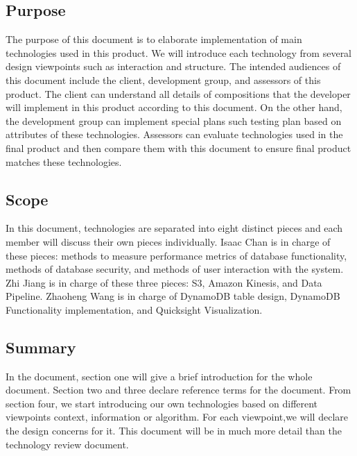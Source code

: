 \subsection{Purpose}
The purpose of this document is to elaborate implementation of main technologies used in this product. We will introduce each technology from several design viewpoints such as interaction and structure. The intended audiences of this document include the client, development group, and assessors of this product. The client can understand all details of compositions that the developer will implement in this product according to this document. On the other hand, the development group can implement special plans such testing plan based on attributes of these technologies. Assessors can evaluate technologies used in the final product and then compare them with this document to ensure final product matches these technologies.  

\subsection{Scope}
In this document, technologies are separated into eight distinct pieces and each member will discuss their own pieces individually. Isaac Chan is in charge of these pieces: methods to measure performance metrics of database functionality, methods of database security, and methods of user interaction with the system. Zhi Jiang is in charge of these three pieces: S3, Amazon Kinesis, and Data Pipeline. Zhaoheng Wang is in charge of DynamoDB table design, DynamoDB Functionality implementation, and Quicksight Visualization.

\subsection{Summary}
In the document, section one will give a brief introduction for the whole document. Section two and three declare reference terms for the document. From section four, we start introducing our own technologies based on different viewpoints context, information or algorithm. For each viewpoint,we will declare the design concerns for it. This document will be in much more detail than the technology review document.  
 
